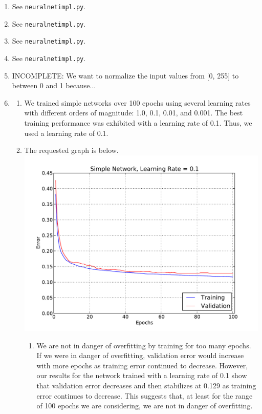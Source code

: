 \documentclass[solution, letterpaper]{cs121}
\begin{document}
\begin{enumerate}
	\item See {\tt neural\textunderscore net\textunderscore impl.py}.
	\item See {\tt neural\textunderscore net\textunderscore impl.py}.
	\item See {\tt neural\textunderscore net\textunderscore impl.py}.
	\item See {\tt neural\textunderscore net\textunderscore impl.py}.
	\item INCOMPLETE: We want to normalize the input values from [0, 255] to between 0 and 1 because... 
	\item
		\begin{enumerate}
		\item We trained simple networks over 100 epochs using several learning rates with different orders of magnitude: 1.0, 0.1, 0.01, and 0.001. The best training performance was exhibited with a learning rate of 0.1. Thus, we used a learning rate of 0.1.
		\item The requested graph is below. \\
		\includegraphics[scale=0.8]{Simple-Network-Alpha-0_1.pdf}
			\begin{enumerate}
				\item We are not in danger of overfitting by training for too many epochs. If we were in danger of overfitting, validation error would increase with more epochs as training error continued to decrease. However, our results for the network trained with a learning rate of 0.1 show that validation error decreases and then stabilizes at 0.129 as training error continues to decrease. This suggests that, at least for the range of 100 epochs we are considering, we are not in danger of overfitting. 

\end{enumerate}
\end{enumerate}
\end{enumerate}
\end{document}
